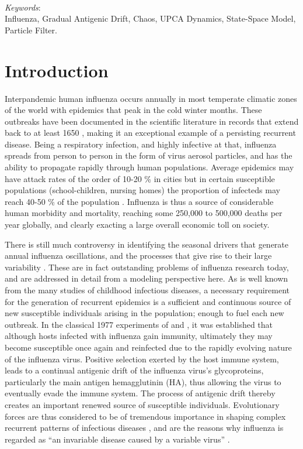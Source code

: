 ~ \\
\textit{Keywords}: \\
Influenza, Gradual Antigenic Drift, Chaos, UPCA Dynamics, State-Space
Model, Particle Filter.

\section{Introduction}
\label{sec:introduction}

Interpandemic human influenza occurs annually in most temperate
climatic zones of the world with epidemics that peak in the cold
winter months. These outbreaks have been documented in the scientific
literature in records that extend back to at least 1650
\citep{Potter2001}, making it an exceptional example of a persisting
recurrent disease.  Being a respiratory infection, and highly
infective at that, influenza spreads from person to person in the form
of virus aerosol particles, and has the ability to propagate rapidly
through human populations. Average epidemics may have attack rates of
the order of 10-20 \% in cities but in certain susceptible populations
(school-children, nursing homes) the proportion of infecteds may reach
40-50 \% of the population \citep{Cox2000a}.  Influenza is thus a source
of considerable human morbidity and mortality, reaching some 250,000
to 500,000 deaths per year globally, and clearly exacting a large
overall economic toll on society.

There is still much controversy in identifying the seasonal drivers
that generate annual influenza oscillations, and the processes that
give rise to their large variability \citep{Finkelman2007}. These are
in fact outstanding problems of influenza research today, and are
addressed in detail from a modeling perspective here. As is well known
from the many studies of childhood infectious diseases, a necessary
requirement for the generation of recurrent epidemics is a sufficient
and continuous source of new susceptible individuals arising in the
population; enough to fuel each new outbreak. In the classical 1977
experiments of \citet{Potter1977} and \citet{Gill1977}, it was
established that although hosts infected with influenza gain immunity,
ultimately they may become susceptible once again and reinfected due
to the rapidly evolving nature of the influenza virus.  Positive
selection exerted by the host immune system, leads to a continual
antigenic drift of the influenza virus's glycoproteins, particularly
the main antigen hemagglutinin (HA), thus allowing the virus to
eventually evade the immune system.  The process of antigenic drift
thereby creates an important renewed source of susceptible
individuals.  Evolutionary forces are thus considered to be of
tremendous importance in shaping complex recurrent patterns of
infectious diseases \citep{Cobey2008}, and are the reasons why
influenza is regarded as ``an invariable disease caused by a variable
virus'' \citep{Potter2001}.

